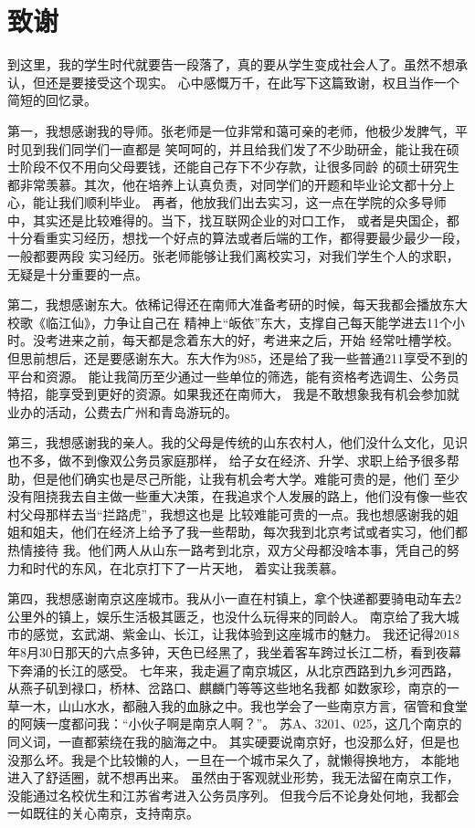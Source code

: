 \chapter{致谢}
到这里，我的学生时代就要告一段落了，真的要从学生变成社会人了。虽然不想承认，但还是要接受这个现实。
心中感慨万千，在此写下这篇致谢，权且当作一个简短的回忆录。

第一，我想感谢我的导师。张老师是一位非常和蔼可亲的老师，他极少发脾气，平时见到我们同学们一直都是
笑呵呵的，并且给我们发了不少助研金，能让我在硕士阶段不仅不用向父母要钱，还能自己存下不少存款，让很多同龄
的硕士研究生都非常羡慕。其次，他在培养上认真负责，对同学们的开题和毕业论文都十分上心，能让我们顺利毕业。
再者，他放我们出去实习，这一点在学院的众多导师中，其实还是比较难得的。当下，找互联网企业的对口工作，
或者是央国企，都十分看重实习经历，想找一个好点的算法或者后端的工作，都得要最少最少一段，一般都要两段
实习经历。张老师能够让我们离校实习，对我们学生个人的求职，无疑是十分重要的一点。

第二，我想感谢东大。依稀记得还在南师大准备考研的时候，每天我都会播放东大校歌《临江仙》，力争让自己在
精神上“皈依”东大，支撑自己每天能学进去11个小时。没考进来之前，每天都是念着东大的好，考进来之后，开始
经常吐槽学校。但思前想后，还是要感谢东大。东大作为985，还是给了我一些普通211享受不到的平台和资源。
能让我简历至少通过一些单位的筛选，能有资格考选调生、公务员特招，能享受到更好的资源。如果我还在南师大，
我是不敢想象我有机会参加就业办的活动，公费去广州和青岛游玩的。

第三，我想感谢我的亲人。我的父母是传统的山东农村人，他们没什么文化，见识也不多，做不到像双公务员家庭那样，
给子女在经济、升学、求职上给予很多帮助，但是他们确实也是尽己所能，让我有机会考大学。难能可贵的是，他们
至少没有阻挠我去自主做一些重大决策，在我追求个人发展的路上，他们没有像一些农村父母那样去当“拦路虎”，我想这也是
比较难能可贵的一点。我也想感谢我的姐姐和姐夫，他们在经济上给予了我一些帮助，每次我到北京考试或者实习，他们都热情接待
我。他们两人从山东一路考到北京，双方父母都没啥本事，凭自己的努力和时代的东风，在北京打下了一片天地，
着实让我羡慕。

第四，我想感谢南京这座城市。我从小一直在村镇上，拿个快递都要骑电动车去2公里外的镇上，娱乐生活极其匮乏，也没什么玩得来的同龄人。
南京给了我大城市的感觉，玄武湖、紫金山、长江，让我体验到这座城市的魅力。
我还记得2018年8月30日那天的六点多钟，天色已经黑了，我坐着客车跨过长江二桥，看到夜幕下奔涌的长江的感受。
七年来，我走遍了南京城区，从北京西路到九乡河西路，从燕子矶到禄口，桥林、岔路口、麒麟门等等这些地名我都
如数家珍，南京的一草一木，山山水水，都融入我的血脉之中。我也学会了一些南京方言，宿管和食堂的阿姨一度都问我：“小伙子啊是南京人啊？”。
苏A、3201、025，这几个南京的同义词，一直都萦绕在我的脑海之中。
其实硬要说南京好，也没那么好，但是也没那么坏。我是个比较懒的人，一旦在一个城市呆久了，就懒得换地方，
本能地进入了舒适圈，就不想再出来。
虽然由于客观就业形势，我无法留在南京工作，没能通过名校优生和江苏省考进入公务员序列。
但我今后不论身处何地，我都会一如既往的关心南京，支持南京。


